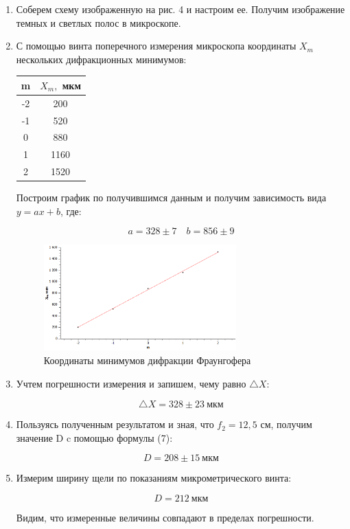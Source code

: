 \documentclass[a4paper, 12pt]{article}%
\begin{document}
\begin{enumerate}

\item Соберем схему изображенную на рис. 4 и настроим ее. Получим изображение темных и светлых полос в микроскопе.

\item С помощью винта поперечного измерения микроскопа координаты $X_m$ нескольких дифракционных минимумов:

\begin{center}
\begin{tabular}{|c|c|}
\hline 
m & $X_m,$ мкм \\ 
\hline 
-2 & 200 \\ 
\hline 
-1 & 520 \\ 
\hline 
0 & 880 \\ 
\hline 
1 & 1160 \\ 
\hline 
2 & 1520 \\ 
\hline 
\end{tabular} 
\end{center}

Построим график по получившимся данным и получим зависимость вида $y = ax + b$, где:

\[a= 328 \pm 7 \quad b = 856 \pm 9\]

\begin{figure}[h]
		\begin{center}
			\includegraphics[width = 0.7\textwidth]{images/graph_2.png}
			\caption{Координаты минимумов дифракции Фраунгофера}
		\end{center}
	\end{figure}

\item Учтем погрешности измерения и запишем, чему равно $\bigtriangleup X$:

\[\bigtriangleup X = 328 \pm 23 \: \text{мкм}\]

\item Пользуясь полученным результатом и зная, что $f_2 = 12,5$ см, получим значение D c помощью формулы (7):

\[D = 208 \pm 15 \: \text{мкм}\]

\item Измерим ширину щели по показаниям микрометрического винта:

\[D = 212 \: \text{мкм}\]

Видим, что измеренные величины совпадают в пределах погрешности.

\end{enumerate}
\end{document}
